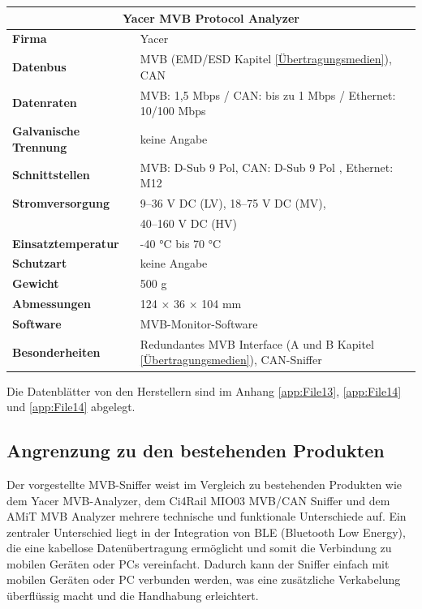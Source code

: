 \hfill
\begin{minipage}{0.57\textwidth}
  \begin{tabular}{|m{3.3cm}|m{4.2cm}|}
    \hline
    \multicolumn{2}{|c|}{\textbf{Yacer MVB Protocol Analyzer}} \\ \hline
    \textbf{Firma} & Yacer \\ \hline
    \textbf{Datenbus} & MVB (EMD/ESD Kapitel \ref{Übertragungsmedien}), CAN \\ \hline
    \textbf{Datenraten} & MVB: 1,5 Mbps / CAN: bis zu 1 Mbps / Ethernet: 10/100 Mbps \\ \hline
    \textbf{Galvanische \mbox{Trennung}} & keine Angabe \\ \hline
    \textbf{Schnittstellen} & MVB: D-Sub 9 Pol, CAN: D-Sub 9 Pol , Ethernet: M12 \\ \hline
    \textbf{Stromversorgung} & 9–36 V DC (LV), 18–75 V DC (MV), \\ 
                                & 40–160 V DC (HV) \\ \hline
    \textbf{Einsatztemperatur} & -40 °C bis 70 °C \\ \hline
    \textbf{Schutzart} & keine Angabe \\ \hline
    \textbf{Gewicht} & 500 g \\ \hline
    \textbf{Abmessungen} & 124 × 36 × 104 mm \\ \hline
    \textbf{Software} & MVB-Monitor-Software \\ \hline
    \textbf{Besonderheiten} & Redundantes MVB Interface (A und B Kapitel \ref{Übertragungsmedien}), CAN-Sniffer \\ \hline
  \end{tabular}
\end{minipage}

Die Datenblätter von den Herstellern sind im Anhang \ref{app:File13}, \ref{app:File14} und \ref{app:File14} abgelegt.


\subsection{Angrenzung zu den bestehenden Produkten}

Der vorgestellte MVB-Sniffer weist im Vergleich zu bestehenden Produkten wie dem Yacer MVB-Analyzer, dem Ci4Rail MIO03 MVB/CAN Sniffer und dem AMiT MVB Analyzer mehrere technische und funktionale Unterschiede auf. Ein zentraler Unterschied liegt in der Integration von BLE (Bluetooth Low Energy), die eine kabellose Datenübertragung ermöglicht und somit die Verbindung zu mobilen Geräten oder PCs vereinfacht. Dadurch kann der Sniffer einfach mit mobilen Geräten oder PC verbunden werden, was eine zusätzliche Verkabelung überflüssig macht und die Handhabung erleichtert.

